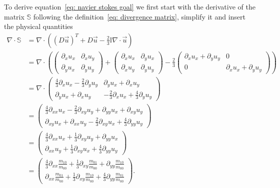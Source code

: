 To derive equation~\eqref{eq: navier stokes goal} we first start with the derivative of the matrix $\mathbb{S}$ following the definition~\eqref{eq: divergence matrix}, simplify it and insert the physical quantities
\begin{equation}
  \begin{aligned}
    \nabla \cdot \mathbb{S} &= \nabla \cdot \left({(D\vec{u})}^T + D\vec{u} - \frac{2}{3}\mathbb{I}\nabla\cdot\vec{u} \right)
    \\ &=
    \nabla \cdot \left(
    \begin{pmatrix}
      \partial_x u_x & \partial_x u_y \\
      \partial_y u_x & \partial_y u_y
    \end{pmatrix}
    +
    \begin{pmatrix}
      \partial_x u_x & \partial_y u_x \\
      \partial_x u_y & \partial_y u_y
    \end{pmatrix}
    -\frac{2}{3}
    \begin{pmatrix}
      \partial_x u_x + \partial_y u_y &  0\\
      0 & \partial_x u_x + \partial_y u_y
    \end{pmatrix}
    \right)
    \\ &=
    \nabla \cdot
    \begin{pmatrix}
      \frac{4}{3}\partial_x u_x - \frac{2}{3}\partial_y u_y & \partial_y u_x + \partial_x u_y \\
      \partial_y u_x + \partial_x u_y & -\frac{2}{3}\partial_x u_x + \frac{4}{3}\partial_y u_y
    \end{pmatrix}
    \\ &=
    \begin{pmatrix}
      \frac{4}{3}\partial_{xx} u_x - \frac{2}{3}\partial_{xy} u_y + \partial_{yy} u_x + \partial_{xy} u_y \\
      \partial_{xy} u_x + \partial_{xx} u_y -\frac{2}{3}\partial_{xy} u_x + \frac{4}{3}\partial_{yy} u_y
    \end{pmatrix}
    \\ &=
    \begin{pmatrix}
      \frac{4}{3}\partial_{xx} u_x + \frac{1}{3}\partial_{xy} u_y + \partial_{yy} u_x \\
      \partial_{xx} u_y +\frac{1}{3}\partial_{xy} u_x + \frac{4}{3}\partial_{yy} u_y
    \end{pmatrix}
    \\ &=
    \begin{pmatrix}
      \frac{4}{3}\partial_{xx} \frac{m_{10}}{m_{00}} + \frac{1}{3}\partial_{xy} \frac{m_{01}}{m_{00}} + \partial_{yy} \frac{m_{10}}{m_{00}} \\
      \partial_{xx} \frac{m_{01}}{m_{00}} +\frac{1}{3}\partial_{xy} \frac{m_{10}}{m_{00}} + \frac{4}{3}\partial_{yy} \frac{m_{01}}{m_{00}}
    \end{pmatrix}.
  \end{aligned}
\end{equation}

